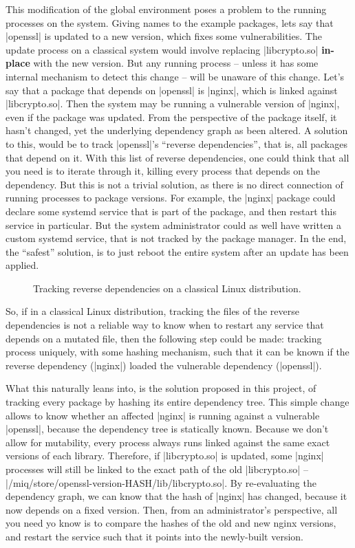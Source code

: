This modification of the global environment poses a problem
to the running processes on the system. Giving names to the
example packages, lets say that |openssl| is updated to a
new version, which fixes some vulnerabilities. The update
process on a classical system would involve replacing
|libcrypto.so| \textbf{in-place} with the new version. But
any running process -- unless it has some internal mechanism
to detect this change -- will be unaware of this change.
Let's say that a package that depends on |openssl| is
|nginx|, which is linked against |libcrypto.so|. Then the
system may be running a vulnerable version of |nginx|, even
if the package was updated. From the perspective of the
package itself, it hasn't changed, yet the underlying
dependency graph as been altered. A solution to this, would
be to track |openssl|'s ``reverse dependencies'', that is,
all packages that depend on it. With this list of reverse
dependencies, one could think that all you need is to
iterate through it, killing every process that depends on
the dependency. But this is not a trivial solution, as there
is no direct connection of running processes to package
versions. For example, the |nginx| package could declare
some systemd service that is part of the package, and then
restart this service in particular. But the system
administrator could as well have written a custom systemd
service, that is not tracked by the package manager. In the
end, the ``safest'' solution, is to just reboot the entire
system after an update has been applied.

\begin{figure}[htb]
    \centerfloat
    
    \caption{Tracking reverse dependencies on a classical Linux distribution.}
    \label{fig:nginx_classic}
\end{figure}


So, if in a classical Linux distribution, tracking the files
of the reverse dependencies is not a reliable way to know
when to restart any service that depends on a mutated file,
then the following step could be made: tracking process
uniquely, with some hashing mechanism, such that it can be
known if the reverse dependency (|nginx|) loaded the
vulnerable dependency (|openssl|).


What this naturally leans into, is the solution proposed in this project, of tracking
every package by hashing its entire dependency tree. This
simple change allows to know whether an affected |nginx| is
running against a vulnerable |openssl|, because the
dependency tree is statically known. Because we don't allow
for mutability, every process always runs linked against the
same exact versions of each library. Therefore, if
|libcrypto.so| is updated, some |nginx| processes will still
be linked to the exact path of the old |libcrypto.so| --
|/miq/store/openssl-version-HASH/lib/libcrypto.so|. By
re-evaluating the dependency graph, we can know that the
hash of |nginx| has changed, because it now depends on a
fixed version. Then, from an administrator's perspective,
all you need yo know is to compare the hashes of the old and
new nginx versions, and restart the service such that it
points into the newly-built version.

